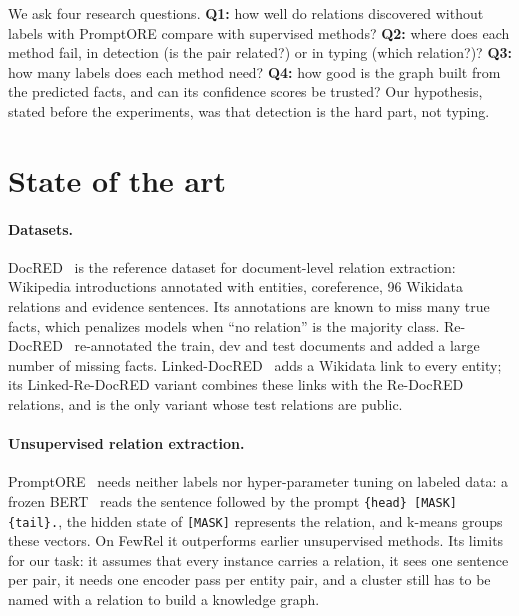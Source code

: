 \documentclass[pdflatex,sn-mathphys-num]{sn-jnl}
\begin{document}
We ask four research questions. \textbf{Q1:} how well do relations discovered without labels with PromptORE compare with supervised methods? \textbf{Q2:} where does each method fail, in detection (is the pair related?) or in typing (which relation?)? \textbf{Q3:} how many labels does each method need? \textbf{Q4:} how good is the graph built from the predicted facts, and can its confidence scores be trusted? Our hypothesis, stated before the experiments, was that detection is the hard part, not typing.

\section{State of the art}\label{sec:sota}

\paragraph{Datasets.} DocRED~\cite{yao2019docred} is the reference dataset for document-level relation extraction: Wikipedia introductions annotated with entities, coreference, 96 Wikidata relations and evidence sentences. Its annotations are known to miss many true facts, which penalizes models when ``no relation'' is the majority class. Re-DocRED~\cite{tan2022redocred} re-annotated the train, dev and test documents and added a large number of missing facts. Linked-DocRED~\cite{genest2023linkeddocred} adds a Wikidata link to every entity; its Linked-Re-DocRED variant combines these links with the Re-DocRED relations, and is the only variant whose test relations are public.

\paragraph{Unsupervised relation extraction.} PromptORE~\cite{genest2023promptore} needs neither labels nor hyper-parameter tuning on labeled data: a frozen BERT~\cite{devlin2019bert} reads the sentence followed by the prompt \texttt{\{head\} [MASK] \{tail\}.}, the hidden state of \texttt{[MASK]} represents the relation, and k-means groups these vectors. On FewRel it outperforms earlier unsupervised methods. Its limits for our task: it assumes that every instance carries a relation, it sees one sentence per pair, it needs one encoder pass per entity pair, and a cluster still has to be named with a relation to build a knowledge graph.
\end{document}

